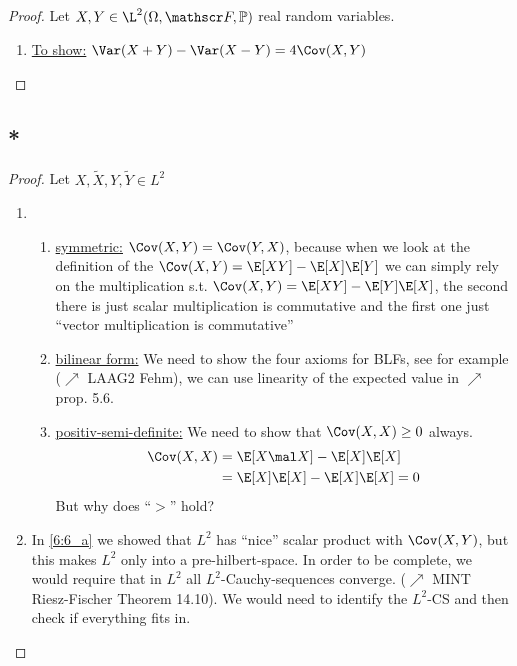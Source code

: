 \subsection{}
\begin{proof}
	Let $X,Y \in \L^2(\O, \F, \meas)$ real random variables.
	\begin{enumerate}
		\item \ul{To show:} $\Var(X+Y) - \Var(X-Y) = 4\Cov(X,Y)$
		
	\end{enumerate}
\end{proof}

\subsection{*}
\begin{proof} Let $X,\tilde{X}, Y, \tilde{Y} \in L^2$
	\begin{enumerate}
		\item 
		\begin{enumerate}
			\item \ul{symmetric:} $\Cov(X,Y) = \Cov(Y,X)$, because when we look at the definition of the $\Cov(X,Y) = \E[XY] - \E[X]\E[Y]$ we can simply rely on the multiplication s.t.
			$\Cov(X,Y) = \E[XY] - \E[Y]\E[X]$, the second there is just scalar multiplication is commutative and the first one just ``vector multiplication is commutative'' %
			\item \ul{bilinear form:} We need to show the four axioms for BLFs, see for example ($\nearrow$ LAAG2 Fehm), we can use linearity of the expected value in $\nearrow$ prop. 5.6.
			\item \ul{positiv-semi-definite:} We need to show that $\Cov(X,X) \ge 0$ always.
			\begin{align*}
				\Cov(X,X) &= \E[X\mal X] - \E[X]\E[X]\\
				&= \E[X]\E[X] - \E[X]\E[X] = 0
			\end{align*}
			But why does ``$>$'' hold? \label{6:6_a}
		\end{enumerate}
	\item In \ref{6:6_a} we showed that $L^2$ has ``nice'' scalar product with $\Cov(X,Y)$, but this makes $L^2$ only into a pre-hilbert-space. In order to be complete, we would require that in $L^2$ all $L^2$-Cauchy-sequences converge. ($\nearrow$ MINT Riesz-Fischer Theorem 14.10). We would need to identify the $L^2$-CS and then check if everything fits in.
	\end{enumerate}
\end{proof}